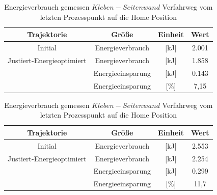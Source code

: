 %
\begin{table}[tbph]
	\centering
	\caption{Energieverbrauch simuliert $Kleben-Seitenwand$ Verfahrweg vom letzten Prozesspunkt auf die  Home Position}
	\label{tab:energieverbrauch-simuliert}
	\begin{tabular}{|c|c|c|c|}
		\hline
		Trajektorie & Größe & Einheit & Wert \\
		\hline
		Initial & Energieverbrauch & [kJ] &2.001  \\
		\hline
		Justiert-Energieoptimiert & Energieverbrauch & [kJ] &1.858  \\
		\hline
		& Energieeinsparung & [kJ] &0.143  \\
		\hline
		& Energieeinsparung & [\%] &7,15  \\
		\hline
	\end{tabular}
	\centering
	\caption{Energieverbrauch gemessen $Kleben-Seitenwand$ Verfahrweg vom letzten Prozesspunkt auf die  Home Position}
	\label{tab:energieverbrauch-gemessen}
	\begin{tabular}{|c|c|c|c|}
		\hline
		Trajektorie & Größe & Einheit & Wert \\
		\hline
		Initial & Energieverbrauch & [kJ] &2.553  \\
		\hline
		Justiert-Energieoptimiert & Energieverbrauch & [kJ] &2.254 \\
		\hline
		& Energieeinsparung & [kJ] &0.299  \\
		\hline
		& Energieeinsparung & [\%] &11,7 \\
		\hline
	\end{tabular}
\end{table}
